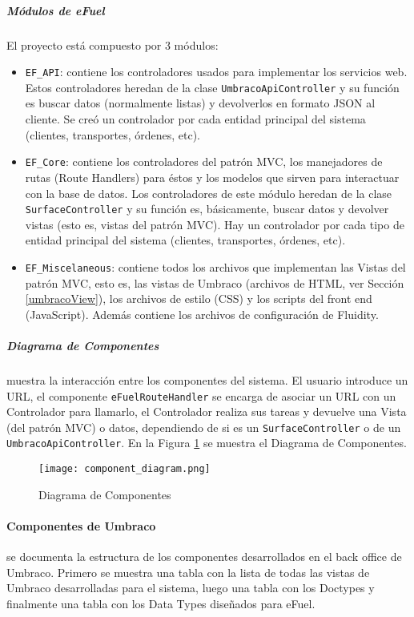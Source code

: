 \subparagraph*{Módulos de eFuel} El proyecto está compuesto por 3 módulos:
\begin{itemize}
    \item \texttt{EF\_API}: contiene los controladores usados para implementar los servicios web. Estos controladores heredan de la clase \texttt{UmbracoApiController} y su función es buscar datos (normalmente listas) y devolverlos en formato JSON al cliente. Se creó un controlador por cada entidad principal del sistema (clientes, transportes, órdenes, etc).
    \item \texttt{EF\_Core}: contiene los controladores del patrón MVC, los manejadores de rutas (Route Handlers) para éstos y los modelos que sirven para interactuar con la base de datos. Los controladores de este módulo heredan de la clase \texttt{SurfaceController} y su función es, básicamente, buscar datos y devolver vistas (esto es, vistas del patrón MVC). Hay un controlador por cada tipo de entidad principal del sistema (clientes, transportes, órdenes, etc).
    \item \texttt{EF\_Miscelaneous}: contiene todos los archivos que implementan las Vistas del patrón MVC, esto es, las vistas de Umbraco (archivos de HTML, ver Sección \ref{umbracoView}), los archivos de estilo (CSS) y los scripts del front end (JavaScript). Además contiene los archivos de configuración de Fluidity.
\end{itemize}

\subparagraph*{Diagrama de Componentes} muestra la interacción entre los componentes del sistema. El usuario introduce un URL, el componente \texttt{eFuel\-RouteHandler} se encarga de asociar un URL con un Controlador para llamarlo, el Controlador realiza sus tareas y devuelve una Vista (del patrón MVC) o datos, dependiendo de si es un \texttt{SurfaceController} o de un \texttt{UmbracoApiController}. En la Figura \ref{fig:component_diagram} se muestra el Diagrama de Componentes.

\begin{figure}[H]
    \texttt{[image: component\_diagram.png]}
    \caption{Diagrama de Componentes}
    \label{fig:component_diagram}
    \centering
\end{figure}

\paragraph{Componentes de Umbraco} se documenta la estructura de los componentes desarrollados en el back office de Umbraco. Primero se muestra una tabla con la lista de todas las vistas de Umbraco desarrolladas para el sistema, luego una tabla con los Doctypes y finalmente una tabla con los Data Types diseñados para eFuel.

